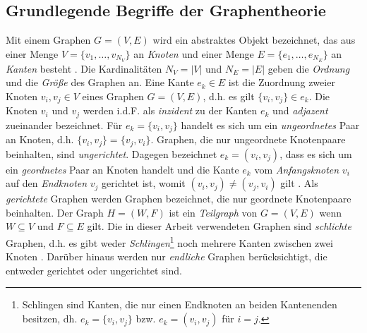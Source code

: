 \documentclass[12pt, a4paper]{report}
\begin{document}
\subsection{Grundlegende Begriffe der Graphentheorie}\label{Grundlegende Begriffe der Graphentheorie}
Mit einem Graphen $G=(V,E)$ wird ein abstraktes Objekt bezeichnet, das aus einer Menge $V=\{v_1,\dots,v_{N_V}\}$ an \textit{Knoten} und einer Menge $E=\{e_1,\dots,e_{N_E}\}$ an \textit{Kanten} besteht \cite{brandes2005graphfunda}. Die Kardinalitäten $N_V =|V|$ und $N_E=|E|$ geben die \textit{Ordnung} und die \textit{Größe} des Graphen an. Eine Kante $e_k \in E$ ist die Zuordnung zweier Knoten $v_i,v_j \in V$ eines Graphen $G=(V,E)$, d.h. es gilt $\{v_i,v_j\} \in e_k$. Die Knoten $v_i$ und $v_j$ werden \mbox{i.d.F.} als \textit{inzident} zu der Kanten $e_k$ und \textit{adjazent} zueinander bezeichnet. Für $e_k=\{v_i,v_j\}$ handelt es sich um ein \textit{ungeordnetes} Paar an Knoten, d.h. $\{v_i,v_j\}=\{v_j,v_i\}$. Graphen, die nur ungeordnete Knotenpaare beinhalten, sind \textit{ungerichtet}. Dagegen bezeichnet $e_k=(v_i,v_j)$, dass es sich um ein \textit{geordnetes} Paar an Knoten handelt und die Kante $e_k$ vom \textit{Anfangsknoten} $v_i$ auf den \textit{Endknoten} $v_j$ gerichtet ist, womit $(v_i,v_j) \neq (v_j, v_i)$ gilt \cite{kolaczyk2009statistical}. Als \textit{gerichtete} Graphen werden Graphen bezeichnet, die nur geordnete Knotenpaare beinhalten. Der Graph $H=(W,F)$ ist ein \textit{Teilgraph} von $G=(V,E)$ wenn $W \subseteq V$ und $F \subseteq E$ gilt. Die in dieser Arbeit verwendeten Graphen sind \textit{schlichte} Graphen, d.h. es gibt weder \textit{Schlingen}\footnote{ Schlingen sind Kanten, die nur einen Endknoten an beiden Kantenenden besitzen, dh. $e_k=\{v_i,v_j\}$ bzw. $e_k=(v_i,v_j)$ für $i=j$.} noch mehrere Kanten zwischen zwei Knoten \cite{tittmann2011graphen}. Darüber hinaus werden nur \textit{endliche} Graphen berücksichtigt, die entweder gerichtet oder ungerichtet sind.\\
\end{document}

